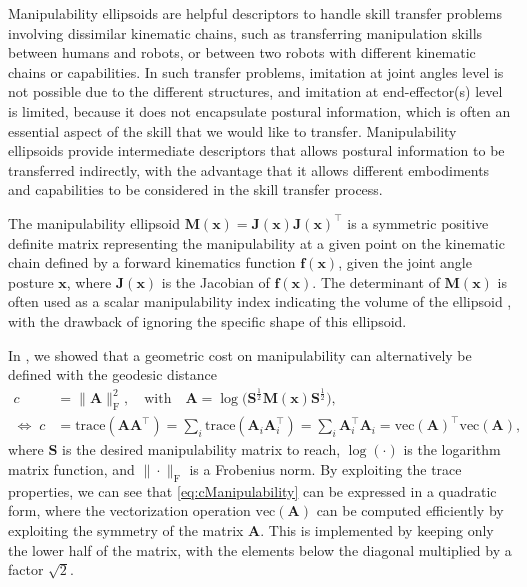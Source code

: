 \documentclass[10pt,a4paper]{article} %
\newcommand{\trsp}{{\scriptscriptstyle\top}}
\begin{document}
Manipulability ellipsoids are helpful descriptors to handle skill transfer problems involving dissimilar kinematic chains, such as transferring manipulation skills between humans and robots, or between two robots with different kinematic chains or capabilities. In such transfer problems, imitation at joint angles level is not possible due to the different structures, and imitation at end-effector(s) level is limited, because it does not encapsulate postural information, which is often an essential aspect of the skill that we would like to transfer. Manipulability ellipsoids provide intermediate descriptors that allows postural information to be transferred indirectly, with the advantage that it allows different embodiments and capabilities to be considered in the skill transfer process.

The manipulability ellipsoid $\bm{M}(\bm{x}) = \bm{J}(\bm{x}) {\bm{J}(\bm{x})}^\trsp$ is a symmetric positive definite matrix representing the manipulability at a given point on the kinematic chain defined by a forward kinematics function $\bm{f}(\bm{x})$, given the joint angle posture $\bm{x}$, where $\bm{J}(\bm{x})$ is the Jacobian of $\bm{f}(\bm{x})$. The determinant of $\bm{M}(\bm{x})$ is often used as a scalar manipulability index indicating the volume of the ellipsoid \cite{Yoshikawa85}, with the drawback of ignoring the specific shape of this ellipsoid. 

In \cite{Jaquier21IJRR}, we showed that a geometric cost on manipulability can alternatively be defined with the geodesic distance
\begin{align}
	c &= \|\bm{A}\|^2_\text{F}, \quad\text{with}\quad \bm{A} = \log\!\big( \bm{S}^\frac{1}{2} \bm{M}(\bm{x}) \bm{S}^\frac{1}{2} \big), \nonumber\\
	\iff\; 
	c &= \text{trace}(\bm{A}\bm{A}^\trsp)=\sum_i\text{trace}(\bm{A}_i\bm{A}_i^\trsp) = \sum_i\bm{A}_i^\trsp\bm{A}_i 
	= {\text{vec}(\bm{A})}^\trsp \text{vec}(\bm{A}),
	\label{eq:cManipulability}
\end{align}
where $\bm{S}$ is the desired manipulability matrix to reach, $\log(\cdot)$ is the logarithm matrix function, and $\| \cdot \|_\text{F}$ is a Frobenius norm. By exploiting the trace properties, we can see that \eqref{eq:cManipulability} can be expressed in a quadratic form, where the vectorization operation $\text{vec}(\bm{A})$ can be computed efficiently by exploiting the symmetry of the matrix $\bm{A}$. This is implemented by keeping only the lower half of the matrix, with the elements below the diagonal multiplied by a factor $\sqrt{2}$.
\end{document}
